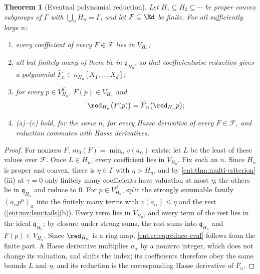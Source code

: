 \documentclass[11pt]{article}
\newtheorem{theorem}{Theorem}[section]
\theoremstyle{plain}
\theoremstyle{plain}
\theoremstyle{plain}
\theoremstyle{definition}
\theoremstyle{definition}
\theoremstyle{definition}
\theoremstyle{definition}
\theoremstyle{remark}
\begin{document}
\begin{theorem}[Eventual polynomial reduction]\label{ent:rc:thm:reduction}
Let $H_1\subseteq H_2\subseteq\cdots$ be proper convex subgroups of $\Gamma$
with $\bigcup_nH_n=\Gamma$, and let $\mathcal F\subseteq\Ed$ be finite. For
all sufficiently large $n$:
\begin{enumerate}[label=\textnormal{(\alph*)},leftmargin=2em]
\item every coefficient of every $F\in\mathcal F$ lies in $V_{H_n}$;
\item all but finitely many of them lie in $\mathfrak q_{H_n}$, so that
coefficientwise reduction gives a polynomial
$\overline F_n\in\kappa_{H_n}[X_1,\ldots,X_d]$;
\item for every $p\in V_{H_n}^d$, $F(p)\in V_{H_n}$ and
\begin{equation}\label{ent:rc:eq:reduce-eval}
 \red_{H_n}\bigl(F(p)\bigr)=\overline F_n\bigl(\red_{H_n}p\bigr);
\end{equation}
\item (a)--(c) hold, for the same $n$, for every Hasse derivative of every
$F\in\mathcal F$, and reduction commutes with Hasse derivatives.
\end{enumerate}
\end{theorem}
\begin{proof}
For nonzero $F$, $m_0(F)=\min_\alpha v(a_\alpha)$ exists; let $L$ be the least of
these values over $\mathcal F$. Once $L\in H_n$, every coefficient lies in
$V_{H_n}$. Fix such an $n$. Since $H_n$ is proper and convex, there is
$\eta\in\Gamma$ with $\eta>H_n$, and by \cref{ent:thm:multi-criterion}(iii)
at $\gamma=0$ only finitely many coefficients have valuation at most $\eta$;
the others lie in $\mathfrak q_{H_n}$ and reduce to $0$. For $p\in
V_{H_n}^d$, split the strongly summable family $(a_\alpha p^\alpha)_\alpha$
into the finitely many terms with $v(a_\alpha)\le\eta$ and the rest
(\cref{ent:mv:lem:tails}(b)). Every term lies in $V_{H_n}$, and every term of
the rest lies in the ideal $\mathfrak q_{H_n}$; by closure under strong sums,
the rest sums into $\mathfrak q_{H_n}$ and $F(p)\in V_{H_n}$. Since $\red_{H_n}$
is a ring map, \eqref{ent:rc:eq:reduce-eval} follows from the finite part. A
Hasse derivative multiplies $a_\alpha$ by a nonzero integer, which does not
change its valuation, and shifts the index; its coefficients therefore obey
the same bounds $L$ and $\eta$, and its reduction is the corresponding Hasse
derivative of $\overline F_n$.
\end{proof}
\end{document}
